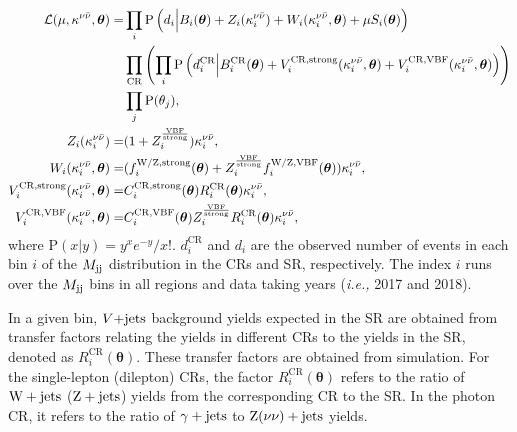 \begin{equation}
  \label{eq:fit_likelihood_func}
  \begin{aligned}
  \mathcal{L} (\mu,\kappa^{\nu\bar{\nu}}, \boldsymbol{\theta}) = & \prod_{i} \mathrm{P}\left(d_{i} \Big{|} B_{i}(\boldsymbol{\theta}) + Z_{i}(\kappa_{i}^{\nu\bar{\nu}})+W_{i}(\kappa_{i}^{\nu\bar{\nu}},\boldsymbol{\theta}) + \mu S_{i}(\boldsymbol{\theta})\right) \\
  & \prod_{\mathrm{CR}} \left( \prod_{i} \mathrm{P} \left(d^{\mathrm{CR}}_{i} \Big{|} B^{\mathrm{CR}}_{i}(\boldsymbol{\theta}) + V_{i}^{\mathrm{CR,strong}}(\kappa_{i}^{\nu\bar{\nu}},\boldsymbol{\theta}) + V_{i}^{\mathrm{CR,VBF}}(\kappa_{i}^{\nu\bar{\nu}},\boldsymbol{\theta}) \right)\right) \\
   & \prod_{j} \mathrm{P}(\theta_{j}), \\
  Z_{i}(\kappa_{i}^{\nu\bar{\nu}}) = & (1+Z^{\frac{\mathrm{VBF}}{\mathrm{strong}}}_{i}) \kappa_{i}^{\nu\bar{\nu}}, \\
  W_{i}(\kappa_{i}^{\nu\bar{\nu}},\boldsymbol{\theta}) = & (f^{\mathrm{W/Z,strong}}_{i}(\boldsymbol{\theta}) + Z^{\frac{\mathrm{VBF}}{\mathrm{strong}}}_{i} f^{\mathrm{W/Z,VBF}}_{i}(\boldsymbol{\theta})) \kappa_{i}^{\nu\bar{\nu}}, \\
  V_{i}^{\mathrm{CR,strong}}(\kappa_{i}^{\nu\bar{\nu}},\boldsymbol{\theta}) = & C^{\mathrm{CR,strong}}_{i}(\boldsymbol{\theta}) R^{\mathrm{CR}}_{i}(\boldsymbol{\theta}) \kappa_{i}^{\nu\bar{\nu}}, \\
  V_{i}^{\mathrm{CR,VBF}}(\kappa_{i}^{\nu\bar{\nu}},\boldsymbol{\theta}) = &C^{\mathrm{CR,VBF}}_{i}(\boldsymbol{\theta}) Z^{\frac{\mathrm{VBF}}{\mathrm{strong}}}_{i} R^{\mathrm{CR}}_{i}(\boldsymbol{\theta}) \kappa_{i}^{\nu\bar{\nu}}, \\
  \end{aligned}
\end{equation}
where ${\mathrm{P}(x|y) = y^{x}e^{-y}/x!}$. $d^{\mathrm{CR}}_{i}$
and $d_{i}$ are the observed number of events in each bin $i$ of
the $M_{\textrm{jj}}$ distribution in the CRs and SR, respectively. The index $i$ runs
over the $M_{\textrm{jj}}$ bins in all regions and data taking years (\textit{i.e.,} 2017 and 2018).

In a given bin, $V\text{+jets}$ background yields expected in the SR are
obtained from transfer factors relating the yields in different
CRs to the yields in the SR, denoted as
$R^{\mathrm{CR}}_{i}(\boldsymbol{\theta})$. These transfer factors are 
obtained from simulation. For the single-lepton (dilepton) CRs, the factor
$R^{\mathrm{CR}}_{i}(\boldsymbol{\theta})$ refers to the ratio
of $\mathrm{W}+\textrm{jets}$ ($\mathrm{Z}+\textrm{jets}$) yields from the corresponding CR to the SR. In the
photon CR, it refers to the ratio of $\gamma+\textrm{jets}$ to $\textrm{Z}(\nu\nu)+\textrm{jets}$ yields.

